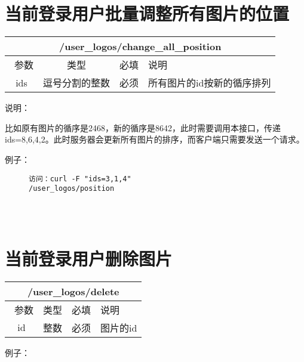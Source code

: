 \documentclass[cs4size]{ctexartutf8}
\begin{document}
\section{当前登录用户批量调整所有图片的位置}

\begin{table}[H]
   \begin{center}
\begin{tabular}{|c|c|c|p{12cm}|}
\hline
\multicolumn{4}{|c|}{/user\_logos/change\_all\_position} \\
\hline\hline
 \  参数  & 类型 & 必填 &  说明  \\
\hline
 ids  & 逗号分割的整数 & 必须 &  所有图片的id按新的循序排列\\
\hline
\end{tabular}
   \end{center}
\end{table}

说明：

比如原有图片的循序是2468，新的循序是8642，此时需要调用本接口，传递ids=8,6,4,2。此时服务器会更新所有图片的排序，而客户端只需要发送一个请求。

例子：

\begin{figure}[H]
\begin{verbatim}
访问：curl -F "ids=3,1,4" 
/user_logos/position




\end{verbatim}
\end{figure}



\section{当前登录用户删除图片}

\begin{table}[H]
   \begin{center}
\begin{tabular}{|c|c|c|p{12cm}|}
\hline
\multicolumn{4}{|c|}{/user\_logos/delete} \\
\hline\hline
 \  参数  & 类型 & 必填 &  说明  \\
\hline
 id  & 整数 & 必须 &  图片的id\\
\hline
\end{tabular}
   \end{center}
\end{table}

例子：
\end{document}

